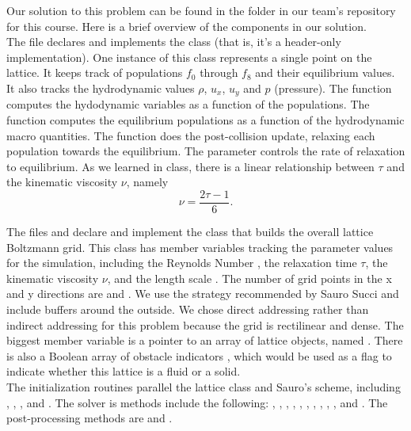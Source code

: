 Our solution to this problem can be found in the folder 
in our team's repository for this course.  
Here is a brief overview of the components in our solution. \\

The file  declares and implements the class 
(that is, it's a header-only implementation).  
One instance of this class represents a single point on the lattice.
It keeps track of populations $f_0$ through $f_8$ and their equilibrium values. 
It also tracks the hydrodynamic values $\rho$, $u_x$, $u_y$ and $p$ (pressure).
The function   computes the hydodynamic variables as a function of the populations.
The function  computes the equilibrium populations as a function of the hydrodynamic macro quantities.
The function  does the post-collision update, relaxing each population towards the equilibrium.
The parameter  controls the rate of relaxation to equilibrium.
As we learned in class, there is a linear relationship between $\tau$ and the kinematic viscosity $\nu$, namely
$$\nu = \frac{2\tau-1}{6}.$$

The files  and  declare and implement the class that builds
the overall lattice Boltzmann grid.  
This class has member variables tracking the parameter values for the simulation, including
the Reynolds Number , the relaxation time $\tau$, 
the kinematic viscosity $\nu$, and the length scale .  
The number of grid points in the x and y directions are  and .
We use the strategy recommended by Sauro Succi and include buffers around the outside.
We chose direct addressing rather than indirect addressing for this problem because the
grid is rectilinear and dense.
The biggest member variable is a pointer to an array of lattice objects, named .
There is also a Boolean array of obstacle indicators , which would be used as a flag to indicate whether this lattice is a fluid or a solid. \\

The initialization routines parallel the lattice class and Sauro's scheme, including , , ,  and . The solver is methods include the following:
, , , , , ,
, , , , and .
The post-processing methods are  and . \\

